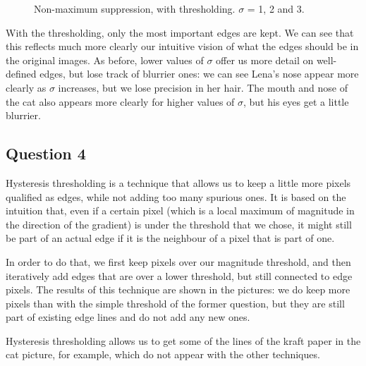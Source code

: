 \documentclass[a4paper]{article}
\begin{document}
\begin{figure}[h]
\begin{subfigure}{0.33\textwidth}
\end{subfigure}

\caption{Non-maximum suppression, with thresholding. $\sigma$ = 1, 2 and 3.}

\end{figure}

With the thresholding, only the most important edges are kept.
We can see that this reflects much more clearly our intuitive vision of what the edges should be in the original images.
As before, lower values of $\sigma$ offer us more detail on well-defined edges, but lose track of blurrier ones: we can see Lena's nose appear more clearly as $\sigma$ increases, but we lose precision in her hair.
The mouth and nose of the cat also appears more clearly for higher values of $\sigma$, but his eyes get a little blurrier.

\FloatBarrier

\subsection*{Question 4}

Hysteresis thresholding is a technique that allows us to keep a little more pixels qualified as edges, while not adding too many spurious ones.
It is based on the intuition that, even if a certain pixel (which is a local maximum of magnitude in the direction of the gradient) is under the threshold that we chose, it might still be part of an actual edge if it is the neighbour of a pixel that is part of one.

In order to do that, we first keep pixels over our magnitude threshold, and then iteratively add edges that are over a lower threshold, but still connected to edge pixels.
The results of this technique are shown in the pictures: we do keep more pixels than with the simple threshold of the former question, but they are still part of existing edge lines and do not add any new ones.

Hysteresis thresholding allows us to get some of the lines of the kraft paper in the cat picture, for example, which do not appear with the other techniques.
\end{document}
